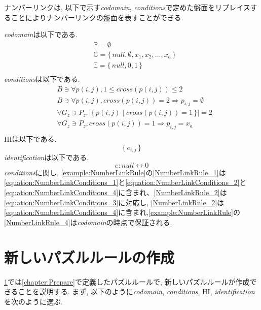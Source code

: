\begin{example}[ナンバーリンクの数学的記述]
  ナンバーリンクは, 以下で示す\textit{codomain}, \textit{conditions}で定めた盤面をリプレイスすることによりナンバーリンクの盤面を表すことができる.

  \textit{codomain}は以下である.
  \begin{align}
     & \mathbb{P}=\emptyset                                             \\
     & \mathbb{C}=\{\,\textit{null}, \emptyset ,x_1,x_2,\ldots, x_a\,\} \\
     & \mathbb{E}=\{\,\textit{null},0,1\,\}                             \\
  \end{align}
  \textit{conditions}は以下である.
  \begin{align}
     & B\ni \forall p(i,j),1\le \textit{cross}(p(i,j))\le 2                          \label{equation:NumberLinkConditions_1} \\
     & B\ni \forall p(i,j),  \textit{cross}(p(i,j))= 2 \Rightarrow p_{i,j}=\emptyset \label{equation:NumberLinkConditions_2} \\
     & \forall G_z\ni P_z,        |\{\,p(i,j)\mid cross(p(i,j))=1\,\}|=2             \label{equation:NumberLinkConditions_3} \\
     & \forall G_z\ni P_z,     \textit{cross}(p(i,j))= 1 \Rightarrow p_{i,j}=x_a     \label{equation:NumberLinkConditions_4} \\
  \end{align}
  HIは以下である.
  \begin{equation}
    \{\,e_{i,j}\,\}
  \end{equation}
  \textit{identification}は以下である.
  \begin{equation}
    e:\textit{null}\leftrightarrow 0
  \end{equation}
  \textit{conditions}に関し, \cref{example:NumberLinkRule}の\ref{NumberLinkRule_1}は\cref{equation:NumberLinkConditions_1}と\cref{equation:NumberLinkConditions_2}と\cref{equation:NumberLinkConditions_4}に含まれ、\ref{NumberLinkRule_2}は\cref{equation:NumberLinkConditions_3}に対応し, \ref{NumberLinkRule_2}は\cref{equation:NumberLinkConditions_4}に含まれ,\cref{example:NumberLinkRule}の\ref{NumberLinkRule_4}は\textit{codomain}の時点で保証される.
\end{example}

\section{新しいパズルルールの作成}\label{section:NewPuzzleRule}
\cref{section:NewPuzzleRule}では\cref{chapter:Prepare}で定義したパズルルールで, 新しいパズルルールが作成できることを説明する. まず, 以下のように\textit{codomain}, \textit{conditions}, HI, \textit{identification}を次のように選ぶ.

